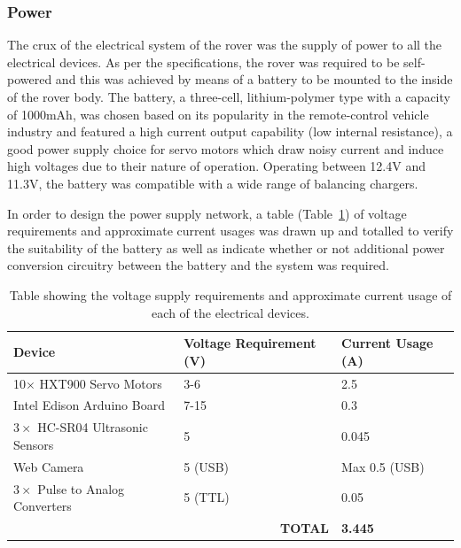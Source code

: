     \subsubsection{Power}
      The crux of the electrical system of the rover was the supply of power to all the electrical devices. As per the specifications, the rover was required to be self-powered and this was achieved by means of a battery to be mounted to the inside of the rover body. The battery, a three-cell, lithium-polymer type with a capacity of 1000mAh, was chosen based on its popularity in the remote-control vehicle industry and featured a high current output capability (low internal resistance), a good power supply choice for servo motors which draw noisy current and induce high voltages due to their nature of operation. Operating between 12.4V and 11.3V, the battery was compatible with a wide range of balancing chargers.
      
      In order to design the power supply network, a table (Table~\ref{tab:elecDesign-powerRequirements}) of voltage requirements and approximate current usages was drawn up and totalled to verify the suitability of the battery as well as indicate whether or not additional power conversion circuitry between the battery and the system was required.
      
      \begin{table}[h!]
      \centering
      \begin{tabular}{@{}lll@{}}
      \toprule
      Device                               & Voltage Requirement (V) & Current Usage (A) \\ \midrule
      10$\times$ HXT900 Servo Motors       & 3-6                     & 2.5               \\
      Intel Edison Arduino Board           & 7-15                    & 0.3               \\
      $3\times$ HC-SR04 Ultrasonic Sensors & 5                       & 0.045             \\
      Web Camera                           & 5 (USB)                 & Max 0.5 (USB)     \\
      $3\times$ Pulse to Analog Converters & 5 (TTL)                 & 0.05               \\ \midrule
      \multicolumn{2}{r}{\textbf{TOTAL}}                             & \textbf{3.445}    \\ \bottomrule
      \end{tabular}
      \caption{Table showing the voltage supply requirements and approximate current usage of each of the electrical devices.}
      \label{tab:elecDesign-powerRequirements}
      \end{table}
      
